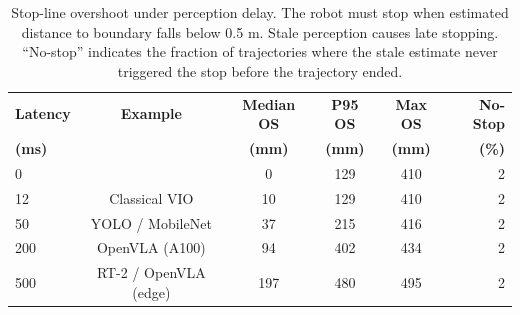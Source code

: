 \begin{table}[t]
\centering
\caption{Stop-line overshoot under perception delay. The robot must stop when estimated distance to boundary falls below 0.5 m. Stale perception causes late stopping. ``No-stop'' indicates the fraction of trajectories where the stale estimate never triggered the stop before the trajectory ended.}
\label{tab:stopline}
\begin{tabular}{@{}lccccr@{}}
\toprule
\textbf{Latency} & \textbf{Example} & \textbf{Median OS} & \textbf{P95 OS} & \textbf{Max OS} & \textbf{No-Stop} \\
\textbf{(ms)} & & \textbf{(mm)} & \textbf{(mm)} & \textbf{(mm)} & \textbf{(\%)} \\
\midrule
0 &  & 0 & 129 & 410 & 2 \\
12 & Classical VIO & 10 & 129 & 410 & 2 \\
50 & YOLO / MobileNet & 37 & 215 & 416 & 2 \\
200 & OpenVLA (A100) & 94 & 402 & 434 & 2 \\
500 & RT-2 / OpenVLA (edge) & 197 & 480 & 495 & 2 \\
\bottomrule
\end{tabular}
\end{table}
